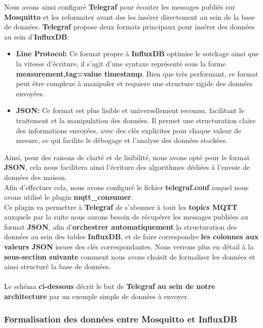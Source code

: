 \documentclass[10pt, a4paper]{report}
\begin{document}
	Nous avons ainsi configuré \textbf{Telegraf} pour écouter les messages publiés sur \textbf{Mosquitto} et les reformater avant des les insérer directement au sein de la base de données.\newpage
	\textbf{Telegraf} propose deux formats principaux pour insérer des données au sein d'\textbf{InfluxDB}:
	\begin{itemize}
		\item \textbf{Line Protocol:} Ce format propre à \textbf{InfluxDB} optimise le sotckage ainsi que la vitesse d'écriture, il s'agit d'une syntaxe représenté sous la forme \textbf{measurement,tag=value timestamp}. Bien que très performant, ce format peut être complexe à manipuler et requiere une structure rigide des données envoyées.
		
		\item \textbf{JSON:} Ce format est plus lisible et universellement reconnu, facilitant le traitement et la manipulation des données. Il permet une structuration claire des informations envoyées, avec des clés explicites pour chaque valeur de mesure, ce qui facilite le débogage et l’analyse des données stockées.
	\end{itemize}
	Ainsi, pour des raisons de clarté et de lisibilité, nous avons opté pour le format \textbf{JSON}, cela nous facilitera ainsi l'écriture des algorithmes dédiées à l'envoie de données des maison.\\
	Afin d'effectuer cela, nous avons configuré le fichier \textbf{telegraf.conf} auquel nous avons utilisé le plugin \textbf{mqtt\_consumer}.\\
	Ce plugin va permettre à \textbf{Telegraf} de s'abonner à tout les \textbf{topics MQTT} auxquels par la suite nous aurons besoin de récupérer les messages publiées au format \textbf{JSON}, afin d'\textbf{orchestrer automatiquement} la structuration des données au sein des tables \textbf{InfluxDB}, et de faire correspondre \textbf{les colonnes aux valeurs JSON} issues des clés correspondantes. Nous verrons plus en détail à la \textbf{sous-section suivante} comment nous avons choisit de formaliser les données et ainsi structuré la base de données.\\\\
	Le schéma \textbf{ci-dessous} décrit le but de \textbf{Telegraf au sein de notre architecture} par un exemple simple de données à envoyer.
	
	
	\subsubsection{Formalisation des données entre Mosquitto et InfluxDB}
	
\end{document}
